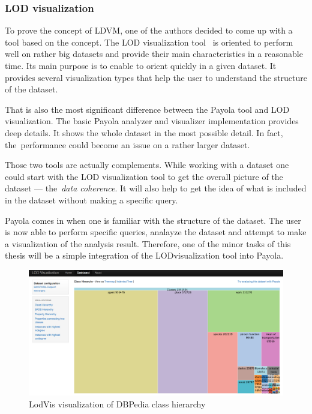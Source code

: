 \subsubsection{LOD visualization}
\label{rw:lodvis}
To prove the concept of LDVM, one of the authors decided to come up with a tool 
based on the concept. The LOD visualization tool~\cite{lodvis} is oriented
to perform well on rather big datasets and 
provide their main characteristics in a reasonable time. Its main purpose is to 
enable to orient quickly in a given dataset. It provides several 
visualization types that help the user to understand the structure of the 
dataset.

That is also the most significant difference between the Payola tool and LOD 
visualization. The basic Payola analyzer and visualizer implementation provides 
deep details. It shows the whole dataset in the most possible detail. In fact, 
the~performance could become an issue on a rather larger dataset.

Those two tools are actually complements. While working with a dataset one could 
start with the LOD visualization tool to get the overall picture of the dataset --- 
the~\emph{data coherence}. It will also help to get the idea of what is included in the 
dataset without making a specific query.

Payola comes in when one is familiar with the structure of the dataset. The user 
is now able to perform specific queries, analayze the dataset and attempt to make a 
visualization of the analysis result. Therefore, one of the minor tasks of this thesis
will be a simple integration of the LODvisualization tool into Payola.

\begin{figure}
	\centering
	\includegraphics[width=140mm]{img/lodvis.png}
	\caption{LodVis visualization of DBPedia class hierarchy}
	\label{fig:lodvis}
\end{figure}

